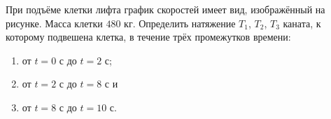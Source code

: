 При подъёме клетки лифта график скоростей имеет вид, изображённый на рисунке.
Масса клетки $480$ кг.
Определить натяжение $T_1$, $T_2$, $T_3$ каната, к которому подвешена клетка,
в течение трёх промежутков времени:
\begin{enumerate}
	\item от $t = 0$ с до $t = 2$ с;
	\item от $t = 2$ с до $t = 8$ с и
	\item от $t = 8$ с до $t = 10$ с.
\end{enumerate}
